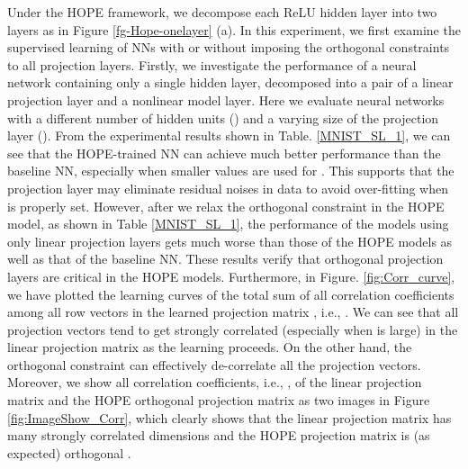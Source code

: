 \documentclass[11pt]{article}
\begin{document}
Under the HOPE framework, we decompose each ReLU hidden layer into two layers as in Figure \ref{fg-Hope-onelayer} (a). In this experiment, we first examine the supervised learning of NNs with or without imposing the orthogonal constraints to all projection layers.  
Firstly, we investigate the performance of a neural network containing only a single hidden layer, decomposed into a pair of a linear projection layer and a nonlinear model layer.  Here we evaluate neural networks with a different number of hidden units () and a varying size of the projection layer (). From the experimental results shown in Table. \ref{MNIST_SL_1}, we can see that 
the HOPE-trained NN can achieve much better performance than the baseline NN, especially when smaller values are used for . This supports that the projection layer may eliminate residual noises in data to avoid over-fitting when  is properly set. 
However, after we relax the orthogonal constraint in the HOPE model, as shown in Table \ref{MNIST_SL_1}, the performance of the models using  only linear projection layers gets much worse than those of the HOPE models as well as that of the baseline NN. 
These results verify that orthogonal projection layers are critical in the HOPE models.
Furthermore, in Figure. \ref{fig:Corr_curve}, we have plotted the learning curves of the total sum of all correlation coefficients among all row vectors in the learned projection matrix , i.e., . 
We can see that all projection vectors tend to get strongly correlated (especially when  is large) in the linear projection matrix as the learning proceeds. On the other hand, the orthogonal constraint can effectively de-correlate all the projection vectors. 
Moreover, we show  all correlation coefficients, i.e., ,  of the linear projection matrix and the HOPE orthogonal projection matrix as two images in Figure \ref{fig:ImageShow_Corr}, which clearly shows that the linear projection matrix has many strongly correlated dimensions and the HOPE projection matrix is (as expected) orthogonal . 
\end{document}
